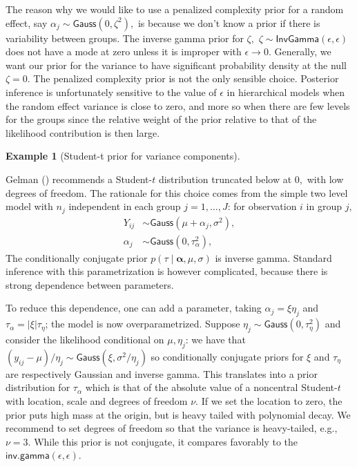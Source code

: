 \documentclass[
  11pt,
  letterpaper,
]{scrbook}
\theoremstyle{definition}
\theoremstyle{plain}
\theoremstyle{plain}
\theoremstyle{definition}
\theoremstyle{definition}
\newtheorem{example}{Example}[chapter]
\theoremstyle{remark}
\begin{document}
The reason why we would like to use a penalized complexity prior for a
random effect, say \(\alpha_j \sim \mathsf{Gauss}(0, \zeta^2),\) is
because we don't know a prior if there is variability between groups.
The inverse gamma prior for \(\zeta,\)
\(\zeta \sim \mathsf{InvGamma}(\epsilon, \epsilon)\) does not have a
mode at zero unless it is improper with \(\epsilon \to 0.\) Generally,
we want our prior for the variance to have significant probability
density at the null \(\zeta=0.\) The penalized complexity prior is not
the only sensible choice. Posterior inference is unfortunately sensitive
to the value of \(\epsilon\) in hierarchical models when the random
effect variance is close to zero, and more so when there are few levels
for the groups since the relative weight of the prior relative to that
of the likelihood contribution is then large.

\begin{example}[Student-t prior for variance
components]\protect\hypertarget{exm-random-effect-variance}{}\label{exm-random-effect-variance}

Gelman () recommends a Student-\(t\)
distribution truncated below at \(0,\) with low degrees of freedom. The
rationale for this choice comes from the simple two level model with
\(n_j\) independent in each group \(j=1, \ldots, J\): for observation
\(i\) in group \(j,\) \begin{align*}
Y_{ij} &\sim \mathsf{Gauss}(\mu + \alpha_j, \sigma^2),\\
\alpha_j &\sim \mathsf{Gauss}(0, \tau^2_\alpha),
\end{align*} The conditionally conjugate prior
\(p(\tau \mid \boldsymbol{\alpha}, \mu, \sigma)\) is inverse gamma.
Standard inference with this parametrization is however complicated,
because there is strong dependence between parameters.

To reduce this dependence, one can add a parameter, taking
\(\alpha_j = \xi \eta_j\) and \(\tau_\alpha=|\xi|\tau_{\eta}\); the
model is now overparametrized. Suppose
\(\eta_j \sim \mathsf{Gauss}(0, \tau^2_\eta)\) and consider the
likelihood conditional on \(\mu, \eta_j\): we have that
\((y_{ij} - \mu)/\eta_j \sim \mathsf{Gauss}(\xi, \sigma^2/\eta_j)\) so
conditionally conjugate priors for \(\xi\) and \(\tau_\eta\) are
respectively Gaussian and inverse gamma. This translates into a prior
distribution for \(\tau_\alpha\) which is that of the absolute value of
a noncentral Student-\(t\) with location, scale and degrees of freedom
\(\nu.\) If we set the location to zero, the prior puts high mass at the
origin, but is heavy tailed with polynomial decay. We recommend to set
degrees of freedom so that the variance is heavy-tailed, e.g.,
\(\nu=3.\) While this prior is not conjugate, it compares favorably to
the \(\mathsf{inv. gamma}(\epsilon, \epsilon).\)

\end{example}
\end{document}
